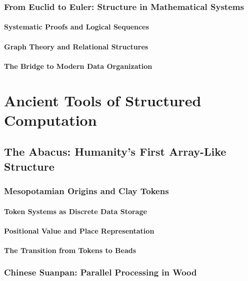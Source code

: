 \documentclass[12pt, oneside, openany]{book}
\begin{document}
\subsection{From Euclid to Euler: Structure in Mathematical Systems}
\subsubsection{Systematic Proofs and Logical Sequences}
\subsubsection{Graph Theory and Relational Structures}
\subsubsection{The Bridge to Modern Data Organization}


\chapter{Ancient Tools of Structured Computation}

\section{The Abacus: Humanity's First Array-Like Structure}
\subsection{Mesopotamian Origins and Clay Tokens}
\subsubsection{Token Systems as Discrete Data Storage}
\subsubsection{Positional Value and Place Representation}
\subsubsection{The Transition from Tokens to Beads}

\subsection{Chinese Suanpan: Parallel Processing in Wood}
\end{document}
